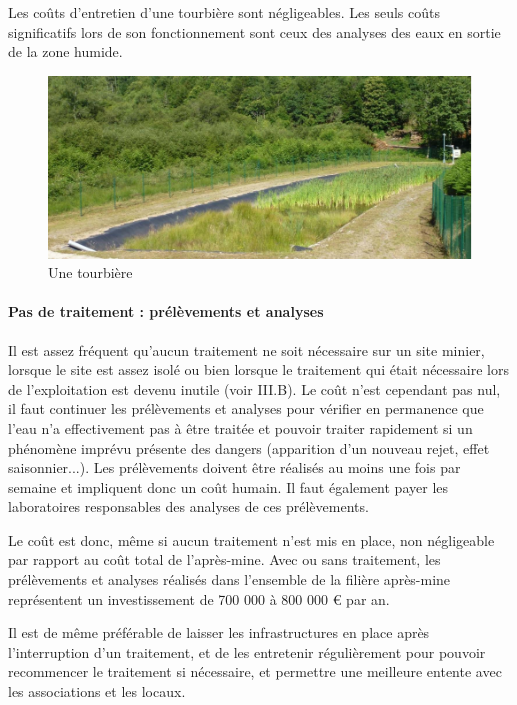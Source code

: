 \documentclass{article}
\begin{document}
Les coûts d’entretien d’une tourbière sont négligeables. Les seuls coûts significatifs lors de son fonctionnement sont ceux des analyses des eaux en sortie de la zone humide.


\begin{figure}[H]
\centering
\includegraphics[width=0.8\linewidth]{III_A_4.png}
\caption{Une tourbière}
\label{fig:tourbiere}
\end{figure}


\paragraph{Pas de traitement : prélèvements et analyses}

Il est assez fréquent qu’aucun traitement ne soit nécessaire sur un site minier, lorsque le site est assez isolé ou bien lorsque le traitement qui était nécessaire lors de l’exploitation est devenu inutile (voir III.B). Le coût n’est cependant pas nul, il faut continuer les prélèvements et analyses pour vérifier en permanence que l’eau n’a effectivement pas à être traitée et pouvoir traiter rapidement si un phénomène imprévu présente des dangers (apparition d’un nouveau rejet, effet saisonnier...). Les prélèvements doivent être réalisés au moins une fois par semaine et impliquent donc un coût humain. Il faut également payer les laboratoires responsables des analyses de ces prélèvements.


Le coût est donc, même si aucun traitement n’est mis en place, non négligeable  par rapport au coût total de l’après-mine. Avec ou sans traitement, les prélèvements et analyses réalisés dans l’ensemble de la filière après-mine représentent un investissement de 700 000 à 800 000 € par an.


Il est de même préférable de laisser les infrastructures en place après l'interruption d’un traitement, et de les entretenir régulièrement pour pouvoir recommencer le traitement si nécessaire, et permettre  une meilleure entente avec les associations et les locaux. 
\end{document}
